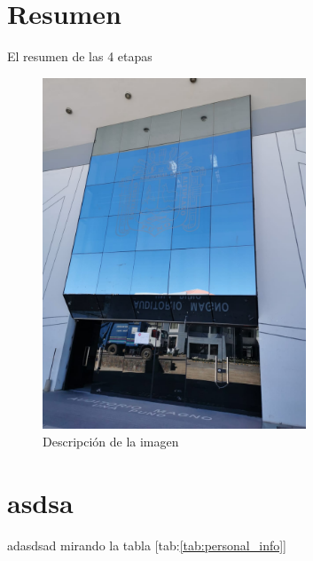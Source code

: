 \section{Resumen }

El resumen de las 4 etapas

\begin{figure}[!htbp]
    \centering
    \includegraphics[width=0.7\textwidth]{images/magno.jpeg}
    \caption{Descripción de la imagen}
    \label{fig:miImagen}
\end{figure}
\FloatBarrier
\section{asdsa}

adasdsad mirando la tabla [tab:\ref{tab:personal_info}]
